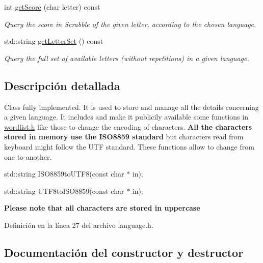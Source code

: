 \begin{DoxyCompactItemize}
int \hyperlink{classLanguage_a02f7ca8ab721b358955c50df51de6df1}{get\+Score} (char letter) const
\begin{DoxyCompactList}\small\item\em Query the score in Scrabble of the given letter, according to the chosen language. \end{DoxyCompactList}\item 
std\+::string \hyperlink{classLanguage_ad72e0fe4a285a849d217a1b9251c79f1}{get\+Letter\+Set} () const
\begin{DoxyCompactList}\small\item\em Query the full set of available letters (without repetitions) in a given language. \end{DoxyCompactList}\end{DoxyCompactItemize}


\subsection{Descripción detallada}
Class fully implemented. It is used to store and manage all the details concerning a given language. It includes and make it publicily available some functions in \hyperlink{wordlist_8h}{wordlist.\+h} like those to change the encoding of characters. {\bfseries All the characters stored in memory use the I\+S\+O8859 standard} but characters read from keyboard might follow the U\+TF standard. These functions allow to change from one to another. 


\begin{DoxyItemize}
\item std\+::string I\+S\+O8859to\+U\+T\+F8(const char $\ast$ in);
\item std\+::string U\+T\+F8to\+I\+S\+O8859(const char $\ast$ in);
\end{DoxyItemize}

{\bfseries Please note that all characters are stored in uppercase} 

Definición en la línea 27 del archivo language.\+h.



\subsection{Documentación del constructor y destructor}
\mbox{\label{classLanguage_ad7c92d28e44058ef4c7ea1b413a4b269}} 

